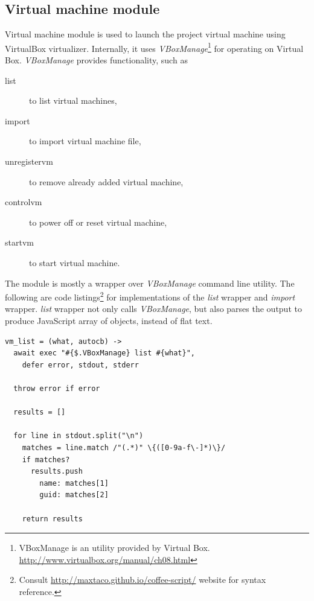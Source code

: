 \subsection{Virtual machine module}

\label{s:c_vm_mod}

Virtual machine module is used to launch the project virtual machine using VirtualBox virtualizer. Internally, it uses \emph{VBoxManage}\footnote{VBoxManage is an utility provided by Virtual Box. \url{http://www.virtualbox.org/manual/ch08.html}} for operating on Virtual Box. \emph{VBoxManage} provides functionality, such as

\begin{description}
\item[list] to list virtual machines,
\item[import] to import virtual machine file,
\item[unregistervm] to remove already added virtual machine,
\item[controlvm] to power off or reset virtual machine,
\item[startvm] to start virtual machine.
\end{description}

The module is mostly a wrapper over \emph{VBoxManage} command line utility. The following are code listings\footnote{Consult \url{http://maxtaco.github.io/coffee-script/} website for syntax reference.} for implementations of the \emph{list} wrapper and \emph{import} wrapper. \emph{list} wrapper not only calls \emph{VBoxManage}, but also parses the output to produce JavaScript array of objects, instead of flat text.

\begin{lstlisting}[caption=Function wrapping \emph{vm list} method.]
vm_list = (what, autocb) ->
  await exec "#{$.VBoxManage} list #{what}", 
    defer error, stdout, stderr

  throw error if error

  results = []

  for line in stdout.split("\n")
    matches = line.match /"(.*)" \{([0-9a-f\-]*)\}/
    if matches?
      results.push 
        name: matches[1]
        guid: matches[2]

    return results
\end{lstlisting}

